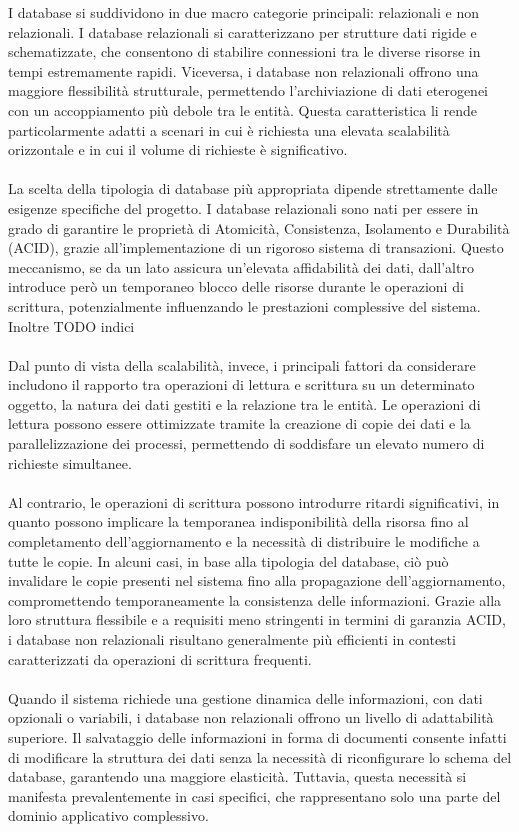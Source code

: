 I database si suddividono in due macro categorie principali: relazionali e non relazionali. 
I database relazionali si caratterizzano per strutture dati rigide e schematizzate, 
che consentono di stabilire connessioni tra le diverse risorse in tempi estremamente rapidi. 
Viceversa, i database non relazionali offrono una maggiore flessibilità strutturale, 
permettendo l’archiviazione di dati eterogenei con un accoppiamento più debole tra le entità. 
Questa caratteristica li rende particolarmente adatti a scenari in cui è richiesta una elevata scalabilità orizzontale 
e in cui il volume di richieste è significativo.\\
\\
La scelta della tipologia di database più appropriata dipende strettamente dalle esigenze specifiche del progetto. 
I database relazionali sono nati per essere in grado di garantire le proprietà di Atomicità, Consistenza, Isolamento e Durabilità (ACID), 
grazie all’implementazione di un rigoroso sistema di transazioni. 
Questo meccanismo, se da un lato assicura un’elevata affidabilità dei dati, 
dall’altro introduce però un temporaneo blocco delle risorse durante le operazioni di scrittura, 
potenzialmente influenzando le prestazioni complessive del sistema. 
Inoltre TODO indici\\
\\
Dal punto di vista della scalabilità, invece, i principali fattori da considerare includono 
il rapporto tra operazioni di lettura e scrittura su un determinato oggetto, la natura dei dati gestiti e la relazione tra le entità. 
Le operazioni di lettura possono essere ottimizzate tramite la creazione di copie dei dati e la parallelizzazione dei processi, 
permettendo di soddisfare un elevato numero di richieste simultanee.\\
\\
Al contrario, le operazioni di scrittura possono introdurre ritardi significativi, 
in quanto possono implicare la temporanea indisponibilità della risorsa fino al completamento dell’aggiornamento e
la necessità di distribuire le modifiche a tutte le copie. 
In alcuni casi, in base alla tipologia del database, ciò può invalidare le copie presenti nel sistema fino alla propagazione dell’aggiornamento, 
compromettendo temporaneamente la consistenza delle informazioni. 
Grazie alla loro struttura flessibile e a requisiti meno stringenti in termini di garanzia ACID, 
i database non relazionali risultano generalmente più efficienti in contesti caratterizzati da operazioni di scrittura frequenti.\\
\\
Quando il sistema richiede una gestione dinamica delle informazioni, con dati opzionali o variabili, 
i database non relazionali offrono un livello di adattabilità superiore. 
Il salvataggio delle informazioni in forma di documenti consente infatti di modificare la struttura dei dati 
senza la necessità di riconfigurare lo schema del database, garantendo una maggiore elasticità. 
Tuttavia, questa necessità si manifesta prevalentemente in casi specifici, 
che rappresentano solo una parte del dominio applicativo complessivo. \\
\\


